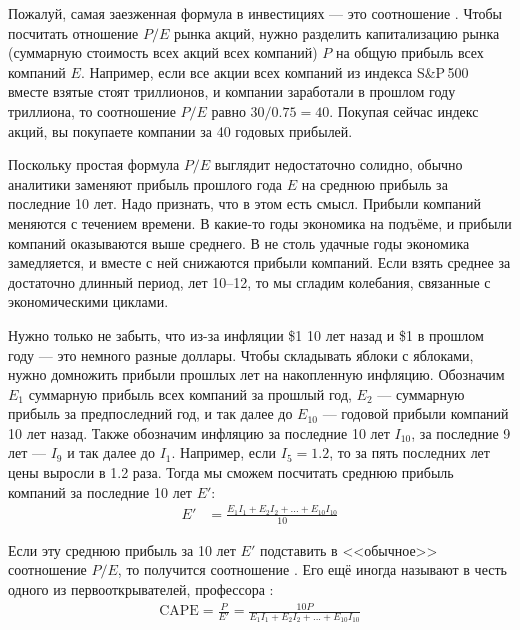 Пожалуй, самая заезженная формула в инвестициях --- это соотношение . Чтобы посчитать отношение $P/E$ рынка акций, нужно разделить капитализацию рынка (суммарную стоимость всех акций всех компаний) $P$ на общую прибыль всех компаний $E$. Например, если все акции всех компаний из индекса S\&P\,500 вместе взятые стоят  триллионов, и компании заработали в прошлом году  триллиона, то соотношение $P/E$ равно $30/0.75 = 40$. Покупая сейчас индекс акций, вы покупаете компании за 40 годовых прибылей.

Поскольку простая формула $P/E$ выглядит недостаточно солидно, обычно аналитики заменяют прибыль прошлого года $E$ на среднюю прибыль за последние 10 лет. Надо признать, что в этом есть смысл. Прибыли компаний меняются с течением времени. В какие-то годы экономика на подъёме, и прибыли компаний оказываются выше среднего. В не столь удачные годы экономика замедляется, и вместе с ней снижаются прибыли компаний. Если взять среднее за достаточно длинный период, лет 10--12, то мы сгладим колебания, связанные с экономическими циклами.

Нужно только не забыть, что из-за инфляции \$1 10 лет назад и \$1 в прошлом году --- это немного разные доллары. Чтобы складывать яблоки с яблоками, нужно домножить прибыли прошлых лет на накопленную инфляцию. Обозначим $E_{1}$ суммарную прибыль всех компаний за прошлый год, $E_2$ --- суммарную прибыль за предпоследний год, и так далее до $E_{10}$ --- годовой прибыли компаний 10 лет назад. Также обозначим инфляцию за последние 10 лет $I_{10}$, за последние 9 лет --- $I_9$ и так далее до $I_1$. Например, если $I_5=1.2$, то за пять последних лет цены выросли в 1.2 раза. Тогда мы сможем посчитать среднюю прибыль компаний за последние 10 лет  $E'$:
\begin{align*}
E' &= \frac{E_1I_1 + E_2I_2 + ... + E_{10}I_{10}}{10}
\end{align*}

Если эту среднюю прибыль за 10 лет $E'$ подставить в <<обычное>> соотношение $P/E$, то получится соотношение . Его ещё иногда называют  в честь одного из первооткрывателей, профессора  \cite{campbell1988dividend}:
\begin{align}
\text{CAPE} = \frac{P}{E'} = \frac{10P}{E_1I_1 + E_2I_2 + ... + E_{10}I_{10}}
\label{cape_formula}
\end{align}

